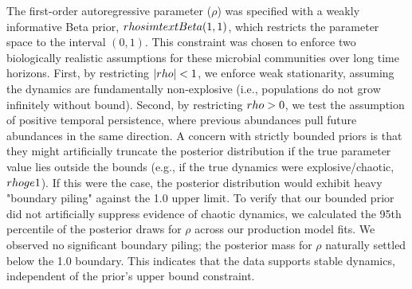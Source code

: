 \documentclass[11pt]{article}
\begin{document}
The first-order autoregressive parameter ($\rho$) was specified with a weakly informative Beta prior, $\\rho \\sim \\text{Beta}(1, 1)$, which restricts the parameter space to the interval $(0, 1)$. This constraint was chosen to enforce two biologically realistic assumptions for these microbial communities over long time horizons. First, by restricting $|\\rho| < 1$, we enforce weak stationarity, assuming the dynamics are fundamentally non-explosive (i.e., populations do not grow infinitely without bound). Second, by restricting $\\rho > 0$, we test the assumption of positive temporal persistence, where previous abundances pull future abundances in the same direction. A concern with strictly bounded priors is that they might artificially truncate the posterior distribution if the true parameter value lies outside the bounds (e.g., if the true dynamics were explosive/chaotic, $\\rho \\ge 1$). If this were the case, the posterior distribution would exhibit heavy "boundary piling" against the 1.0 upper limit. To verify that our bounded prior did not artificially suppress evidence of chaotic dynamics, we calculated the 95th percentile of the posterior draws for $\rho$ across our production model fits. We observed no significant boundary piling; the posterior mass for $\rho$ naturally settled below the 1.0 boundary. This indicates that the data supports stable dynamics, independent of the prior’s upper bound constraint.
\end{document}
